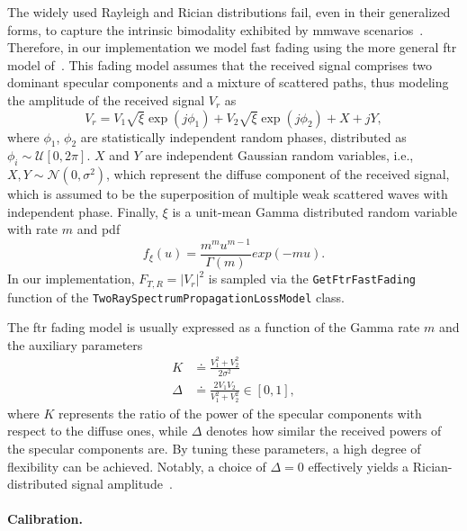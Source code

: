 The widely used Rayleigh and Rician distributions fail, even in their generalized forms, to capture the intrinsic bimodality exhibited by \gls{mmwave} scenarios~\cite{yacoub2007kappa, cotton2014human, mavridis2015near}.
Therefore, in our implementation we model fast fading using the more general \gls{ftr} model of~\cite{7917287}. %
This fading model assumes that the received signal comprises two dominant specular components and a mixture of scattered paths, thus modeling the amplitude of the received signal $V_r$ as
\begin{equation}
   V_r = V_1 \sqrt{\xi} \exp(j \phi_1) + V_2 \sqrt{\xi} \exp(j \phi_2) + X + jY,
\end{equation}
where $\phi_1$, $\phi_2$ are statistically independent random phases, distributed as  $\phi_{i} \sim \mathcal{U} \left[ 0, 2\pi\right]$. $X$ and $Y$ are independent Gaussian random variables, i.e., $X, Y \sim \mathcal{N} (0, \sigma^2)$, which represent the diffuse component of the received signal, which is assumed to be the superposition of multiple weak scattered waves with independent phase. Finally, $\xi$ is a unit-mean Gamma distributed random variable with rate $m$ and \gls{pdf}
\begin{equation}
   f_{\xi} (u) = \frac{m^m u^{m-1}}{\Gamma (m)} exp(-m u).
\end{equation}
In our implementation, $F_{T, R} = \left| V_r \right|^2$ is sampled via the \texttt{Get\-Ftr\-Fast\-Fading} function of the \texttt{Two\-Ray\-Spectrum\-Propagation\-Loss\-Model} class.

The \gls{ftr} fading model is usually expressed as a function of the Gamma rate $m$ and the auxiliary parameters
\begin{align}
    K &\doteq \frac{V_1^2 + V_2^2}{2 \sigma^2} \\
    \Delta &\doteq \frac{2 V_1 V_2}{V_1^2 + V_2^2} \in \left[ 0, 1 \right],
\end{align}
where $K$ represents the ratio of the power of the specular components with respect to the diffuse ones, while $\Delta$ denotes how similar the received powers of the specular components are. By tuning these parameters, a high degree of flexibility can be achieved. Notably, a choice of $\Delta = 0$ effectively yields a Rician-distributed signal amplitude~\cite{7917287}.

\paragraph{Calibration.}

